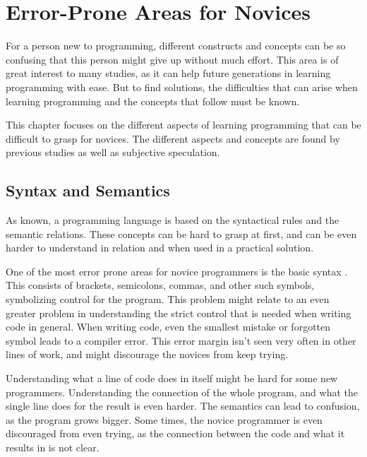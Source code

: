 \chapter{Error-Prone Areas for Novices}
\label{chap:error-prone_areas_for_novices}
For a person new to programming, different constructs and concepts can be so confusing that this person might give up without much effort. This area is of great interest to many studies, as it can help future generations in learning programming with ease. But to find solutions, the difficulties that can arise when learning programming and the concepts that follow must be known.

This chapter focuses on the different aspects of learning programming that can be difficult to grasp for novices. The different aspects and concepts are found by previous studies as well as subjective speculation.

\section{Syntax and Semantics}
As known, a programming language is based on the syntactical rules and the semantic relations. These concepts can be hard to grasp at first, and can be even harder to understand in relation and when used in a practical solution.

One of the most error prone areas for novice programmers is the basic syntax \cite{Garner05}. This consists of brackets, semicolons, commas, and other such symbols, symbolizing control for the program. This problem might relate to an even greater problem in understanding the strict control that is needed when writing code in general. When writing code, even the smallest mistake or forgotten symbol leads to a compiler error. This error margin isn't seen very often in other lines of work, and might discourage the novices from keep trying.

Understanding what a line of code does in itself might be hard for some new programmers. Understanding the connection of the whole program, and what the single line does for the result is even harder. The semantics can lead to confusion, as the program grows bigger. Some times, the novice programmer is even discouraged from even trying, as the connection between the code and what it results in is not clear.

